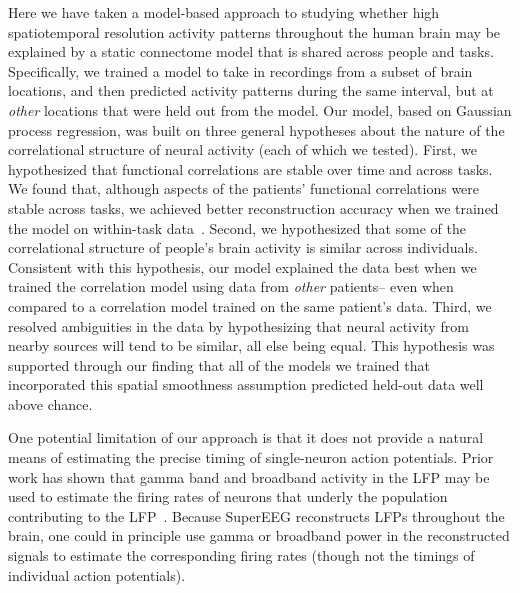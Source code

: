 \documentclass[11pt]{article}
\begin{document}
Here we have taken a model-based approach to studying whether high
spatiotemporal resolution activity patterns throughout the human brain
may be explained by a static connectome model that is shared across
people and tasks.  Specifically, we trained a model to take in
recordings from a subset of brain locations, and then predicted
activity patterns during the same interval, but at \textit{other}
locations that were held out from the model.  Our model, based on
Gaussian process regression, was built on three general hypotheses
about the nature of the correlational structure of neural activity
(each of which we tested).  First, we hypothesized that functional
correlations are stable over time and across tasks.  We found that,
although aspects of the patients' functional correlations were
stable across tasks, we achieved better reconstruction accuracy when
we trained the model on within-task data~\citep[we acknowledge that
our general approach could potentially be extended to better model
across-task changes, following][and others]{ColeEtal16, TavoEtal16}.
Second, we hypothesized that some of the correlational structure of
people's brain activity is similar across individuals.  Consistent
with this hypothesis, our model explained the data best when we
trained the correlation model using data from \textit{other}
patients-- even when compared to a correlation model trained on the
same patient's data.  Third, we resolved ambiguities in the data by
hypothesizing that neural activity from nearby sources will tend to be
similar, all else being equal.  This hypothesis was supported through
our finding that all of the models we trained that incorporated this
spatial smoothness assumption predicted held-out data well above chance.

One potential limitation of our approach is that it does not provide a
natural means of estimating the precise timing of single-neuron action
potentials.  Prior work has shown that gamma band and broadband
activity in the LFP may be used to estimate the firing rates of
neurons that underly the population contributing to the
LFP~\cite{MillEtal08, MannEtal09, JacoEtal10b, CronEtal11}.  Because
SuperEEG reconstructs LFPs throughout the brain, one could in
principle use gamma or broadband power in the reconstructed signals to
estimate the corresponding firing rates (though not the timings of
individual action potentials).
\end{document}

